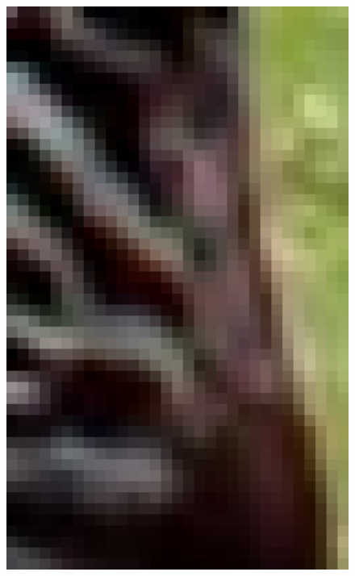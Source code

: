 \documentclass[review,numbers,sort&compress]{elsarticle}  %
\begin{document}
\begin{figure}[t]
{\begin{minipage}[b]{0.12\textwidth}
                \includegraphics[width=1\textwidth]{compareImage/SME_zebra_mag_2.png}
            \end{minipage}
        }
\end{figure}
\end{document}
